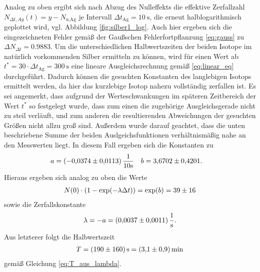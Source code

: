 \noindent
Analog zu oben ergibt sich nach Abzug des Nulleffekts die effektive Zerfallzahl 
$N_{\Delta t,Ag}(t) = y- N_\text{u,Ag}$ je Intervall $\Delta t_\text{Ag} = \qty[]{10}{\second}$,
die erneut halblogarithmisch geplottet wird, vgl. Abbildung \ref{fig:silber1_log}.
Auch hier ergeben sich die eingezeichneten Fehler gemäß der Gaußschen Fehlerfortpflanzung \eqref{eq:gauss} zu $\Delta N_{\Delta t} = \num{0.9883}$.
Um die unterschiedlichen Halbwertszeiten der beiden Isotope im natürlich vorkommenden Silber ermitteln zu können, wird für einen Wert ab 
$t^* = 30 \cdot \Delta t_\text{Ag} = \qty[]{300}{\second}$ eine lineare Ausgleichsrechnung gemäß \eqref{eq:linear_eq} durchgeführt.
Dadurch können die gesuchten Konstanten des langlebigen Isotops ermittelt werden, da hier das kurzlebige Isotop nahezu vollständig zerfallen ist.
Es sei angemerkt, dass aufgrund der Werteschwankungen im späteren Zeitbereich der Wert $t^*$ so festgelegt wurde, 
dass zum einen die zugehörige Ausgleichsgerade nicht zu steil verläuft,
und zum anderen die resultierenden Abweichungen der gesuchten Größen nicht allzu groß sind.
Außerdem wurde darauf geachtet, dass die unten beschriebene Summe der beiden Auslgeichsfunktionen verhältnismäßig nahe an den Messwerten liegt.
In diesem Fall ergeben sich die Konstanten zu 
\begin{align}
    a &= (\num{-0.0374 +- 0.0113}) \, \frac{1}{10 \unit{\second}}  & b &= \num{3.6702 +- 0.4201}.
\end{align}
Hieraus ergeben sich analog zu oben die Werte 
\begin{align}
    N(0) \cdot \left(1- \exp(- \lambda \Delta t)\right) = \exp(b) = \num[]{39 +- 16}
\end{align}
sowie die Zerfallskonstante 
\begin{align}
    \lambda = - a = \qty[]{0.0037 +- 0.0011}{\per\second}.
\end{align}
Aus letzterer folgt die Halbwertszeit 
\begin{align}
    T = \qty[]{190 +- 160}{\second} = \qty[]{3.1 +- 0.9}{\minute}
\end{align}
gemäß Gleichung \eqref{eq:T_aus_lambda}.





